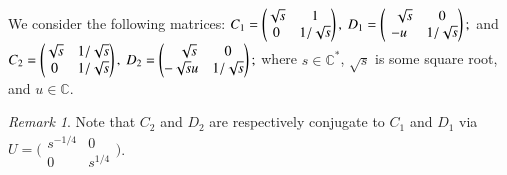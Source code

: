 \documentclass[a4paper]{amsart}
\theoremstyle{plain}
\newtheorem{fact}[theorem]{Fact}
\theoremstyle{definition}
\theoremstyle{remark}
\newtheorem{remark}{Remark}%
\newcommand{\C}{{\mathbb C}}
\newcommand{\CC}{{\mathbb C}}
\newcommand{\SL}{{\mathrm{SL}_2(\C)}}
\begin{document}
  We consider the following matrices: 
$C_1=
  \begin{pmatrix}
    \sqrt{s}&1\\
    0&{1}/{\sqrt{s}}
  \end{pmatrix},\ 
D_1=
  \begin{pmatrix}
   \hphantom{-}\sqrt{s}&0\\
   -u&{1}/{\sqrt{s}}
  \end{pmatrix};
$
and 
$
C_2=
  \begin{pmatrix}
    \sqrt{s}&{1}/{\sqrt{s}}\\
    0&{1}/{\sqrt{s}}
  \end{pmatrix},\ 
D_2=
  \begin{pmatrix}
    \hphantom{-t}\sqrt{s}&0\\
    -\sqrt{s}u&{1}/{\sqrt{s}}
  \end{pmatrix};
$
where $s \in \CC^*$, $\sqrt{s}$ is some square root, and $u \in \CC$.
\begin{remark}\label{remCD}
Note that $C_2$ and $D_2$ are respectively conjugate to $C_1$ and $D_1$ via $U=\bigl(
   \begin{smallmatrix}
     s^{-1/4}&0\\
     0&s^{1/4}
   \end{smallmatrix}
\bigr)$.
\end{remark}

 
\end{document}
